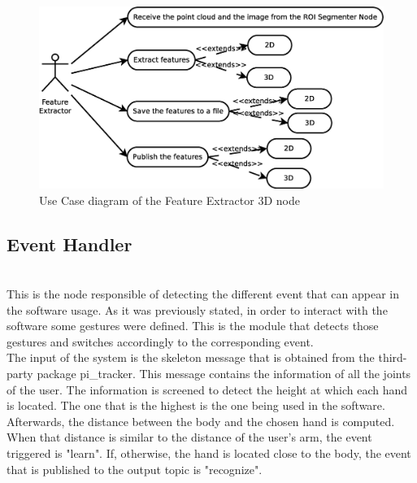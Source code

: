 	\begin{figure}[h]
		\begin{center}
			\includegraphics[scale=0.2]{img/diagrams/uc_feature_extractor.eps}
			\caption[Use case diagram Feature Extractor 3D node]{Use Case diagram of the Feature Extractor 3D node}
		\end{center}
	\end{figure}

\subsection{Event Handler}\\

	This is the node responsible of detecting the different event that can appear in the software usage. As it was previously stated, in order to interact with the software some gestures were defined. This is the module that detects those gestures and switches accordingly to the corresponding event. 
	\\

	The input of the system is the skeleton message that is obtained from the third-party package pi\_tracker. This message contains the information of all the joints of the user. The information is screened to detect the height at which each hand is located. The one that is the highest is the one being used in the software. Afterwards, the distance between the body and the chosen hand is computed. When that distance is similar to the distance of the user's arm, the event triggered is "learn". If, otherwise, the hand is located close to the body, the event that is published to the output topic is "recognize". 
	\\

